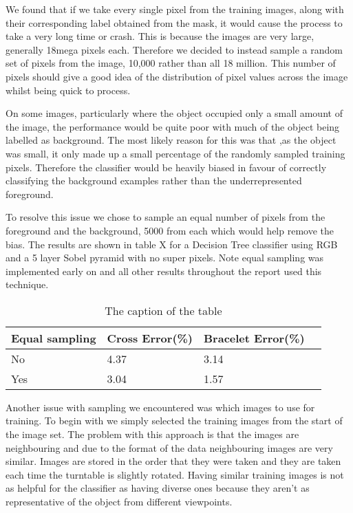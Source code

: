 \documentclass[12pt]{IIBproject}
\begin{document}
We found that if we take every single pixel from the training images, along with their corresponding label obtained from the mask, it would cause the process to take a very long time or crash. This is because the images are very large, generally 18mega pixels each. Therefore we decided to instead sample a random set of pixels from the image, 10,000 rather than all 18 million. This number of pixels should give a good idea of the distribution of pixel values across the image whilst being quick to process. 

On some images, particularly where the object occupied only a small amount of the image, the performance would be quite poor with much of the object being labelled as background. The most likely reason for this was that ,as the object was small, it only made up a small percentage of the randomly sampled training pixels. Therefore the classifier would be heavily biased in favour of correctly classifying the background examples rather than the underrepresented foreground.

 To resolve this issue we chose to sample an equal number of pixels from the foreground and the background, 5000 from each which would help remove the bias. The results are shown in table X for a Decision Tree classifier using RGB and a 5 layer Sobel pyramid with no super pixels. Note equal sampling  was implemented early on and all other results throughout the report used this technique.
 \begin{table}
 \begin{center}
    \begin{tabular}{ | l | l | l | p{5cm} |}
    \hline
    Equal sampling & Cross Error(\%) & Bracelet Error(\%) \\ \hline
    No & 4.37 & 3.14 \\ \hline
    Yes & 3.04 & 1.57 \\
    \hline
    
    \end{tabular}
    \caption{The caption of the table}\label{table:somename}
\end{center}
\end{table}
 
Another issue with sampling we encountered was which images to use for training. To begin with we simply selected the training images from the start of the image set. The problem with this approach is that the images are neighbouring and due to the format of the data neighbouring images are very similar. Images are stored in the order that they were taken and they are taken each time the turntable is slightly rotated. Having similar training images is not as helpful for the classifier as having diverse ones because they aren't as representative of the object from different viewpoints. 
\end{document}
